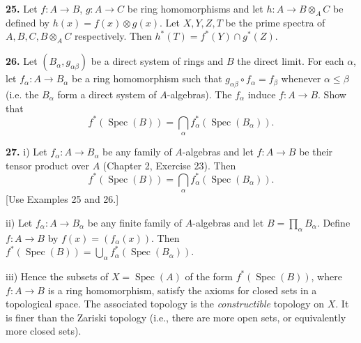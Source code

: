 
\noindent\textbf{25.} Let \(f:A\to B\), \(g:A\to C\) be ring homomorphisms and let \(h:A\to B\otimes_A C\) be defined by \(h(x)=f(x)\otimes g(x)\). Let \(X,Y,Z,T\) be the prime spectra of \(A,B,C,B\otimes_A C\) respectively. Then \(h^*(T)=f^*(Y)\cap g^*(Z)\).

\noindent[Let \(\mathfrak p\in X\), and let \(k=k(\mathfrak p)\) be the residue field at \(\mathfrak p\). By Exercise 21, the fiber \((h^*)^{-1}(\mathfrak p)\) is the spectrum of
\[
(B\otimes_A C)\otimes_A k\cong(B\otimes_A k)\otimes_k(C\otimes_A k).
\]
Hence \(\mathfrak p\in h^*(T)\Longleftrightarrow(B\otimes_A k)\otimes_k(C\otimes_A k)\neq0\Longleftrightarrow B\otimes_A k\neq0\) and \(C\otimes_A k\neq0\Longleftrightarrow\mathfrak p\in f^*(Y)\cap g^*(Z)\).]

\noindent\textbf{26.} Let \((B_\alpha,g_{\alpha\beta})\) be a direct system of rings and \(B\) the direct limit. For each \(\alpha\), let \(f_\alpha:A\to B_\alpha\) be a ring homomorphism such that \(g_{\alpha\beta}\circ f_\alpha=f_\beta\) whenever \(\alpha\leq\beta\) (i.e. the \(B_\alpha\) form a direct system of \(A\)-algebras). The \(f_\alpha\) induce \(f:A\to B\). Show that
\[
f^*(\operatorname{Spec}(B))=\bigcap_\alpha f_\alpha^*(\operatorname{Spec}(B_\alpha)).
\]

\noindent[Let \(\mathfrak p\in\operatorname{Spec}(A)\). Then \((f^*)^{-1}(\mathfrak p)\) is the spectrum of
\[
B\otimes_A k(\mathfrak p)\cong\varinjlim_\alpha(B_\alpha\otimes_A k(\mathfrak p))
\]
(since tensor products commute with direct limits: Chapter 2, Exercise 20). By Exercise 21 of Chapter 2 it follows that \((f^*)^{-1}(\mathfrak p)=\varnothing\) if and only if \(B_\alpha\otimes_A k(\mathfrak p)=0\) for some \(\alpha\), i.e., if and only if \((f_\alpha^*)^{-1}(\mathfrak p)=\varnothing\).]

\noindent\textbf{27.} i) Let \(f_\alpha:A\to B_\alpha\) be any family of \(A\)-algebras and let \(f:A\to B\) be their tensor product over \(A\) (Chapter 2, Exercise 23). Then
\[
f^*(\operatorname{Spec}(B))=\bigcap_\alpha f_\alpha^*(\operatorname{Spec}(B_\alpha)).
\]
[Use Examples 25 and 26.]

ii) Let \(f_\alpha:A\to B_\alpha\) be any finite family of \(A\)-algebras and let \(B=\prod_\alpha B_\alpha\). Define \(f:A\to B\) by \(f(x)=(f_\alpha(x))\). Then \(f^*(\operatorname{Spec}(B))=\bigcup_\alpha f_\alpha^*(\operatorname{Spec}(B_\alpha))\).

iii) Hence the subsets of \(X=\operatorname{Spec}(A)\) of the form \(f^*(\operatorname{Spec}(B))\), where \(f:A\to B\) is a ring homomorphism, satisfy the axioms for closed sets in a topological space. The associated topology is the \emph{constructible} topology on \(X\). It is finer than the Zariski topology (i.e., there are more open sets, or equivalently more closed sets).

